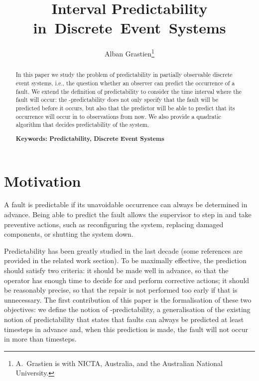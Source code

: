 \documentclass{article}
\begin{document}
\title{Interval Predictability \mbox{in Discrete Event Systems}}
\author{Alban Grastien\thanks{A.~Grastien is with NICTA, Australia, 
and the Australian National University.}
}

\maketitle

\begin{abstract}
  In this paper we study the problem of predictability 
  in partially observable discrete event systems, 
  i.e., the question whether an observer 
  can predict the occurrence of a fault.  
  We extend the definition of predictability 
  to consider the time interval where the fault will occur: 
  the -predictability does not only specify 
  that the fault will be predicted before it occurs, 
  but also that the predictor will be able 
  to predict that its occurrence will occur 
  in  to  observations from now.  
  We also provide a quadratic algorithm 
  that decides predictability of the system.  

  {\bf Keywords: Predictability, Discrete Event Systems}
\end{abstract}

\section{Motivation}
A fault is predictable 
if its unavoidable occurrence can always be determined in advance.  
Being able to predict the fault 
allows the supervisor to step in 
and take preventive actions, 
such as reconfiguring the system, 
replacing damaged components, or shutting the system down.  

Predictability has been greatly studied in the last decade 
(some references are provided in the related work section).  
To be maximally effective, 
the prediction should satisfy two criteria: 
it should be made well in advance, 
so that the operator has enough time 
to decide for and perform corrective actions; 
it should be reasonably precise, 
so that the repair is not performed too early 
if that is unnecessary.  
The first contribution of this paper is the formalisation 
of these two objectives: 
we define the notion of -predictability, 
a generalisation of the existing notion of predictability 
that states that faults can always be predicted 
at least  timesteps in advance 
and, when this prediction is made, 
the fault will not occur in more than  timesteps.  
\end{document}
